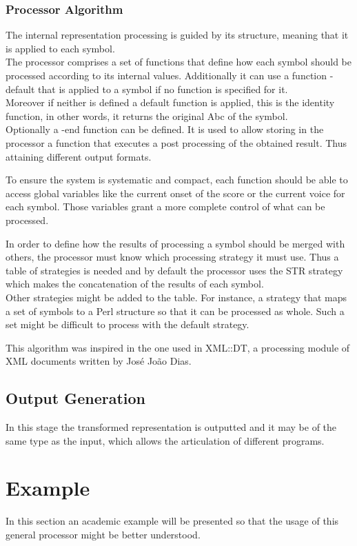\documentclass[main.tex]{subfiles}
\begin{document}
\subsubsection{Processor Algorithm}

The internal representation processing is guided by its structure, meaning that it is applied to
each symbol.\\
The processor comprises a set of functions that define how each symbol should be processed
according to its internal values. Additionally it can use a function -default that is applied to a
symbol if no function is specified for it.\\
Moreover if neither is defined a default function is applied, this is the identity function, in
other words, it returns the original Abc of the symbol.\\
Optionally a -end function can be defined. It is used to allow storing in the processor a function
that executes a post processing of the obtained result. Thus attaining different output formats.

To ensure the system is systematic and compact, each function should be able to access global
variables like the current onset of the score or the current voice for each symbol. Those variables
grant a more complete control of what can be processed.

In order to define how the results of processing a symbol should be merged with others, the
processor must know which processing strategy it must use. Thus a table of strategies is needed and
by default the processor uses the STR strategy which makes the concatenation of the results of each
symbol.\\
Other strategies might be added to the table. For instance, a strategy that maps a set of symbols to
a Perl structure so that it can be processed as whole. Such a set might be difficult to process with
the default strategy.

This algorithm was inspired in the one used in XML::DT\cite{tesejj}, a processing module of XML
documents written by José João Dias.

\subsection{Output Generation}
In this stage the transformed representation is outputted and it may be of the same type as the
input, which allows the articulation of different programs.


\section{Example}
In this section an academic example will be presented so that the usage of this general processor
might be better understood.
\end{document}
